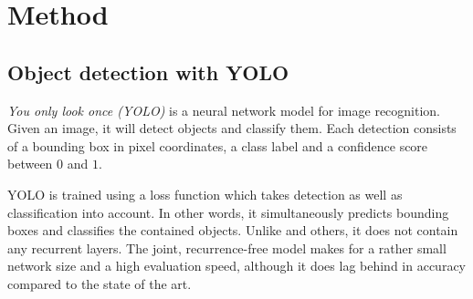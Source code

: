 \section{Method}
\label{sec:method}

\subsection{Object detection with YOLO}

\textit{You only look once (YOLO)} \citep{RedmonYouOnlyLook2015} is a neural network model for image recognition.
Given an image, it will detect objects and classify them.
Each detection consists of a bounding box in pixel coordinates, a class label and a confidence score between $0$ and $1$.

YOLO is trained using a loss function which takes detection as well as classification into account.
In other words, it simultaneously predicts bounding boxes and classifies the contained objects.
Unlike \cite{HeMaskRCNN2017} and others, it does not contain any recurrent layers.
The joint, recurrence-free model makes for a rather small network size and a high evaluation speed, although it does lag behind in accuracy compared to the state of the art.

